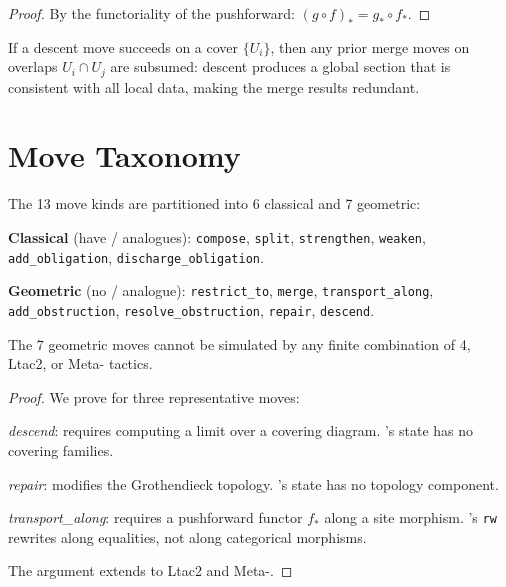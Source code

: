 \documentclass[11pt]{article}
\begin{document}
\begin{proof}
By the functoriality of the pushforward: $(g \circ f)_* = g_* \circ f_*$.
\end{proof}

\begin{lemma}\label{lem:descent-merge}
If a descent move succeeds on a cover $\{U_i\}$, then any
prior merge moves on overlaps $U_i \cap U_j$ are subsumed:
descent produces a global section that is consistent with all
local data, making the merge results redundant.
\end{lemma}


\section{Move Taxonomy}\label{sec:taxonomy}

\begin{definition}\label{def:kinds}
The 13 move kinds are partitioned into 6 classical and
7 geometric:

\noindent\textbf{Classical} (have \LEAN/\Coq{} analogues):
\texttt{compose}, \texttt{split}, \texttt{strengthen},
\texttt{weaken}, \texttt{add\_obligation},
\texttt{discharge\_obligation}.

\noindent\textbf{Geometric} (no \LEAN/\Coq{} analogue):
\texttt{restrict\_to}, \texttt{merge},
\texttt{transport\_along}, \texttt{add\_obstruction},
\texttt{resolve\_obstruction}, \texttt{repair},
\texttt{descend}.
\end{definition}

\begin{theorem}\label{thm:inexpressible}
The 7 geometric moves cannot be simulated by any finite
combination of \LEAN{} 4, Ltac2, or Meta-\Fstar{} tactics.
\end{theorem}

\begin{proof}
We prove for three representative moves:

\emph{descend}: requires computing a limit over a covering
diagram.  \LEAN's state has no covering families.

\emph{repair}: modifies the Grothendieck topology.
\LEAN's state has no topology component.

\emph{transport\_along}: requires a pushforward functor
$f_*$ along a site morphism.  \LEAN's \texttt{rw} rewrites
along equalities, not along categorical morphisms.

The argument extends to Ltac2 and Meta-\Fstar.
\end{proof}
\end{document}
